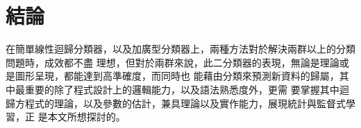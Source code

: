 	\section{結論}
		在簡單線性迴歸分類器，以及加廣型分類器上，兩種方法對於解決兩群以上的分類問題時，成效都不盡			理想，但對於兩群來說，此二分類器的表現，無論是理論或是圖形呈現，都能達到高準確度，而同時也			能藉由分類來預測新資料的歸屬，其中最重要的除了程式設計上的邏輯能力，以及語法熟悉度外，更需			要掌握其中迴歸方程式的理論，以及參數的估計，兼具理論以及實作能力，展現統計與監督式學習，正			是本文所想探討的。
%









